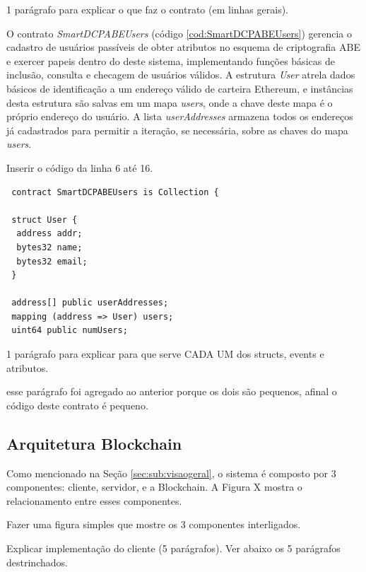 \documentclass[a4paper,11pt]{article}
\begin{document}
{\color{Magenta} 1 parágrafo para explicar o que faz o contrato (em linhas gerais).}

O contrato \emph{SmartDCPABEUsers} (código \ref{cod:SmartDCPABEUsers}) gerencia o cadastro de usuários passíveis de obter atributos no esquema de criptografia ABE e exercer papeis dentro do deste sistema, implementando funções básicas de inclusão, consulta e checagem de usuários válidos.
A estrutura \emph{User} atrela dados básicos de identificação a um endereço válido de carteira Ethereum, e instâncias desta estrutura são salvas em um mapa \emph{users}, onde a chave deste mapa é o próprio endereço do usuário.
A lista \emph{userAddresses} armazena todos os endereços já cadastrados para permitir a iteração, se necessária, sobre as chaves do mapa \emph{users}.

{\color{Magenta} Inserir o código da linha 6 até 16.}

\begin{lstlisting}
 contract SmartDCPABEUsers is Collection {

 struct User {
  address addr;
  bytes32 name;
  bytes32 email;
 }

 address[] public userAddresses;
 mapping (address => User) users;
 uint64 public numUsers;
\end{lstlisting}

{\color{Magenta} 1 parágrafo para explicar para que serve CADA UM dos structs, events e atributos.}

{\color{RoyalBlue} esse parágrafo foi agregado ao anterior porque os dois são pequenos, afinal o código deste contrato é pequeno.}

\subsection{Arquitetura Blockchain}

Como mencionado na Seção \ref{sec:sub:visaogeral}, o sistema é composto por 3 componentes: cliente, servidor, e a Blockchain. A Figura X mostra o relacionamento entre esses componentes.

{\color{ForestGreen} Fazer uma figura simples que mostre os 3 componentes interligados. }


{\color{ForestGreen} Explicar implementação do cliente (5 parágrafos). Ver abaixo os 5 parágrafos destrinchados. }
\end{document}
